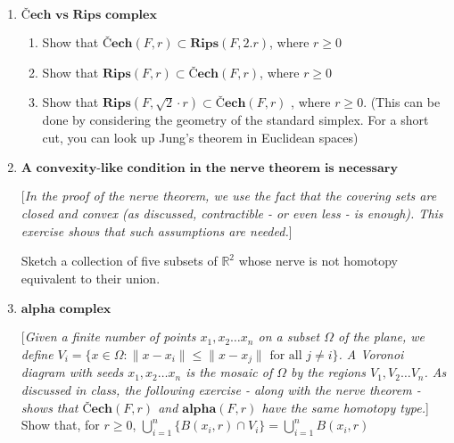 \documentclass[14pt,leqno]{article}
\begin{document}
\begin{enumerate}

\item $\textbf{\v{C}ech vs Rips complex}$

\begin{enumerate}
\item Show that $\textbf{\v{C}ech} (F,r)  \subset \textbf{Rips} (F,2.r)$, where $r \ge 0$

\item  Show that $ \textbf{Rips} (F,r) \subset \textbf{\v{C}ech} (F,r)$, where $r \ge 0$

\item  Show that $ \textbf{Rips} (F, \sqrt{2} \cdot r ) \subset \textbf{\v{C}ech} (F,r)$ , where $r \ge 0$. (This can be done by considering the geometry of the standard simplex. For a short cut, you can look  up Jung's theorem in Euclidean spaces)

\end{enumerate}


\item  $\textbf{A convexity-like condition in the nerve theorem is necessary}$

[\textit{In the proof of the nerve theorem, we use the fact that the covering sets are closed and convex (as discussed, contractible - or even less - is enough). This exercise shows that such assumptions are needed.}]

Sketch a collection of  five subsets of $\mathbb{R}^2$ whose nerve is not homotopy equivalent to their union.

\item  $\textbf{alpha  complex}$

[\textit{Given a finite number of points $x_1, x_2 \dots x_n$ on a subset $\Omega$ of the plane, we define $V_{i} = \{ x \in \Omega : \|x - x_i\| \leqslant \|x - x_j\| \text{ for all } j \neq i\}$. A Voronoi diagram with seeds $x_1, x_2 \dots x_n$ is the mosaic of $\Omega$ by the regions $V_1, V_2 \dots V_n $. As discussed in class, the following exercise - along with the nerve theorem - shows that $\textbf{\v{C}ech} (F,r)$ and $\textbf{alpha} (F,r)$ have the same homotopy type.}] \\

Show that, for $r \ge 0$, $\displaystyle{\bigcup_{i=1}^n \{B(x_i,r) \cap V_i \} = \bigcup_{i=1}^n B(x_i,r) }  $




\end{enumerate}
\end{document}
